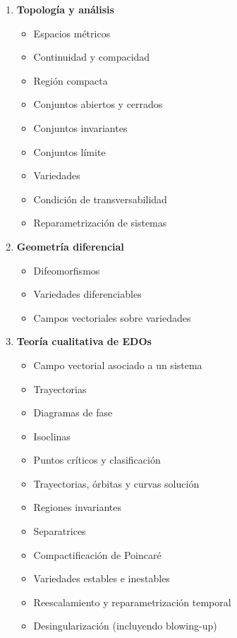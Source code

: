 \begin{enumerate}
    	\item \textbf{Topología y análisis}
    	\begin{itemize}
    		\item Espacios métricos
    		\item Continuidad y compacidad
    		\item Región compacta
    		\item Conjuntos abiertos y cerrados
    		\item Conjuntos invariantes
    		\item Conjuntos límite
    		\item Variedades
    		\item Condición de transversabilidad
    		\item Reparametrización de sistemas
    	\end{itemize}
    	
    	\item \textbf{Geometría diferencial}
    	\begin{itemize}
    		\item Difeomorfismos
    		\item Variedades diferenciables
    		\item Campos vectoriales sobre variedades
    	\end{itemize}
    	
    	\item \textbf{Teoría cualitativa de EDOs}
    	\begin{itemize}
    		\item Campo vectorial asociado a un sistema \checkmark
    		\item Trayectorias \checkmark
    		\item Diagramas de fase \checkmark
    		\item Isoclinas \checkmark
    		\item Puntos críticos y clasificación
    		\item Trayectorias, órbitas y curvas solución
    		\item Regiones invariantes
    		\item Separatrices
    		\item Compactificación de Poincaré
    		\item Variedades estables e inestables
    		\item Reescalamiento y reparametrización temporal
    		\item Desingularización (incluyendo blowing-up)
    	\end{itemize}
    	

\end{enumerate}

